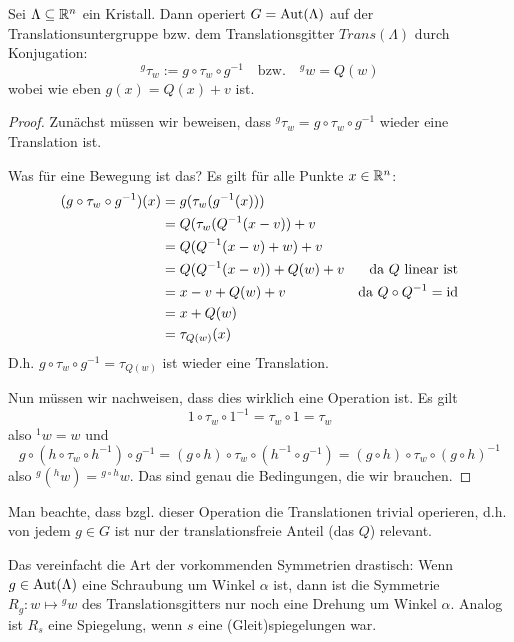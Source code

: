 \begin{lemma}
Sei $\Lambda\subseteq\mathbb{R}^n$ ein Kristall. Dann operiert $G=\operatorname{Aut}(\Lambda)$ auf der Translationsuntergruppe bzw. dem Translationsgitter $Trans(\Lambda)$ durch Konjugation:
\[{^g \tau_w} := g\circ\tau_w\circ g^{-1} \quad\text{bzw.}\quad {^g w} = Q(w)\]
wobei wie eben $g(x)=Q(x)+v$ ist.
\end{lemma}
\begin{proof}
Zunächst müssen wir beweisen, dass ${^g \tau_w}=g\circ\tau_w\circ g^{-1}$ wieder eine Translation ist.

Was für eine Bewegung ist das? Es gilt für alle Punkte $x\in\mathbb{R}^n$:
\begin{align*}
(g\circ\tau_w\circ g^{-1})(x) &= g(\tau_w(g^{-1}(x))) \\
&= Q(\tau_w(Q^{-1}(x-v))+v \\
&= Q(Q^{-1}(x-v)+w)+v \\
&= Q(Q^{-1}(x-v))+Q(w)+v &\text{da $Q$ linear ist}\\
&= x-v+Q(w)+v &\text{da }Q\circ Q^{-1}=\operatorname{id}\\
&= x+Q(w) \\
&=\tau_{Q(w)}(x)
\end{align*}
D.h. $g\circ\tau_w\circ g^{-1} = \tau_{Q(w)}$ ist wieder eine Translation.

\medbreak
Nun müssen wir nachweisen, dass dies wirklich eine Operation ist. Es gilt
\[1\circ\tau_w\circ 1^{-1} = \tau_w\circ 1 = \tau_w\]
also ${^1 w} = w$ und
\[g\circ(h\circ\tau_w\circ h^{-1})\circ g^{-1} = (g\circ h)\circ\tau_w\circ(h^{-1}\circ g^{-1}) = (g\circ h)\circ\tau_w\circ(g\circ h)^{-1}\]
also ${^g(^h w)} = {^{g\circ h}w}$. Das sind genau die Bedingungen, die wir brauchen.
\end{proof}

\begin{remark}
Man beachte, dass bzgl. dieser Operation die Translationen trivial operieren, d.h. von jedem $g\in G$ ist nur der translationsfreie Anteil (das $Q$) relevant.

Das vereinfacht die Art der vorkommenden Symmetrien drastisch: Wenn $g\in\operatorname{Aut}(\Lambda)$ eine Schraubung um Winkel $\alpha$ ist, dann ist die Symmetrie $R_g:w\mapsto{^g w}$ des Translationsgitters nur noch eine Drehung um Winkel $\alpha$. Analog ist $R_s$ eine Spiegelung, wenn $s$ eine (Gleit)spiegelungen war.
\end{remark}

